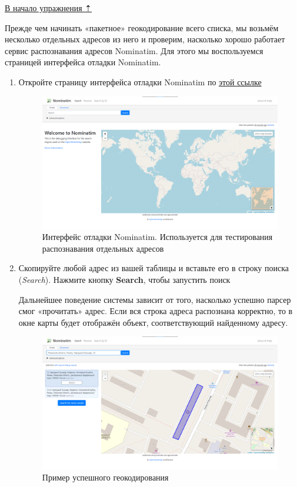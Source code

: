 \documentclass[
  12pt,
]{book}
\begin{document}
\protect\hyperlink{geocoding}{В начало упражнения ⇡}

Прежде чем начинать «пакетное» геокодирование всего списка, мы возьмём несколько отдельных адресов из него и проверим, насколько хорошо работает сервис распознавания адресов Nominatim. Для этого мы воспользуемся страницей интерфейса отладки Nominatim.

\begin{enumerate}
\def\labelenumi{\arabic{enumi}.}
\item
  Откройте страницу интерфейса отладки Nominatim по \href{https://nominatim.openstreetmap.org/ui/search.html}{этой ссылке}

  \begin{figure}
  \centering
  \includegraphics{images/Ex08_Geocoding/Nominatim01.png}
  \caption{Интерфейс отладки Nominatim. Используется для тестирования распознавания отдельных адресов}
  \end{figure}
\item
  Скопируйте любой адрес из вашей таблицы и вставьте его в строку поиска (\emph{Search}). Нажмите кнопку \textbf{Search}, чтобы запустить поиск

  Дальнейшее поведение системы зависит от того, насколько успешно парсер смог «прочитать» адрес. Если вся строка адреса распознана корректно, то в окне карты будет отображён объект, соответствующий найденному адресу.

  \begin{figure}
  \centering
  \includegraphics{images/Ex08_Geocoding/Nominatim02.png}
  \caption{Пример успешного геокодирования}
  \end{figure}


\end{enumerate}
\end{document}
